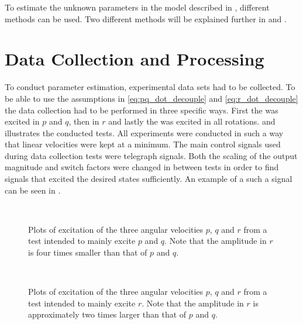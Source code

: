 To estimate the unknown parameters in the \abbrROV model described in , different methods can be used. Two different methods will be explained further in  and .  
\section{Data Collection and Processing}  
To conduct parameter estimation, experimental data sets had to be collected. To be able to use the assumptions in \eqref{eq:pq_dot_decouple} and \eqref{eq:r_dot_decouple} the data collection had to be performed in three specific ways.
First the \abbrROV was excited in $p$ and $q$, then in $r$ and lastly the \abbrROV was excited in all rotations.  and  illustrates the conducted tests. All experiments were conducted in such a way that linear velocities were kept at a minimum.
The main control signals used during data collection tests were telegraph signals. Both the scaling of the output magnitude and switch factors were changed in between tests in order to find signals that excited the desired states sufficiently. An example of a such a signal can be seen in .

\begin{figure}[htbp]
  \centering
  \qquad
  \\
  \caption{\label{fig:pqTest}%
 Plots of excitation of the three angular velocities $p$, $q$ and $r$ from a test intended to mainly excite $p$ and $q$. Note that the amplitude in $r$ is four times smaller than that of $p$ and $q$.}
\end{figure}

\begin{figure}[htbp]
  \centering
  \qquad
  \\
  \caption{\label{fig:rTest}%
 Plots of excitation of the three angular velocities $p$, $q$ and $r$ from a test intended to mainly excite $r$. Note that the amplitude in $r$ is approximately two times larger than that of $p$ and $q$.}
\end{figure}

